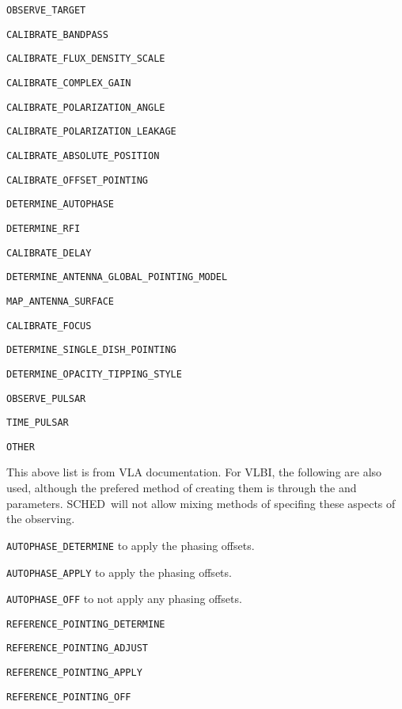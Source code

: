 \documentclass{report}
\newcommand{\schedb}{{\sc SCHED~}}
\begin{document}
\begin{list}{}{\parsep 0em  \itemsep 0em }
\item {\tt OBSERVE\_TARGET}
\item {\tt CALIBRATE\_BANDPASS}
\item {\tt CALIBRATE\_FLUX\_DENSITY\_SCALE} 
\item {\tt CALIBRATE\_COMPLEX\_GAIN}
\item {\tt CALIBRATE\_POLARIZATION\_ANGLE}
\item {\tt CALIBRATE\_POLARIZATION\_LEAKAGE}
\item {\tt CALIBRATE\_ABSOLUTE\_POSITION}
\item {\tt CALIBRATE\_OFFSET\_POINTING}
\item {\tt DETERMINE\_AUTOPHASE}
\item {\tt DETERMINE\_RFI}
\item {\tt CALIBRATE\_DELAY}
\item {\tt DETERMINE\_ANTENNA\_GLOBAL\_POINTING\_MODEL}
\item {\tt MAP\_ANTENNA\_SURFACE}
\item {\tt CALIBRATE\_FOCUS}
\item {\tt DETERMINE\_SINGLE\_DISH\_POINTING}
\item {\tt DETERMINE\_OPACITY\_TIPPING\_STYLE}
\item {\tt OBSERVE\_PULSAR}
\item {\tt TIME\_PULSAR}
\item {\tt OTHER}
\end{list}

This above list is from VLA documentation.  For VLBI, the following
are also used, although the prefered method of creating them is
through the  and 
 parameters.  \schedb will not
allow mixing methods of specifing these aspects of the observing.

\begin{list}{}{\parsep 0em  \itemsep 0em }
\item {\tt AUTOPHASE\_DETERMINE} to apply the phasing offsets.
\item {\tt AUTOPHASE\_APPLY} to apply the phasing offsets.
\item {\tt AUTOPHASE\_OFF} to not apply any phasing offsets.
\item {\tt REFERENCE\_POINTING\_DETERMINE}
\item {\tt REFERENCE\_POINTING\_ADJUST}
\item {\tt REFERENCE\_POINTING\_APPLY}
\item {\tt REFERENCE\_POINTING\_OFF}
\end{list}
\end{document}

